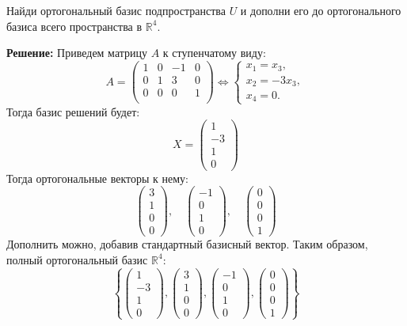 \documentclass[a4paper,12pt]{article}
\begin{document}
Найди ортогональный базис подпространства $U$ и дополни его до ортогонального базиса всего пространства в $\mathbb{R}^4$.

\textbf{Решение:}
Приведем матрицу $A$ к ступенчатому виду:
\[
A = \begin{pmatrix}
1 & 0 & -1 & 0 \\
0 & 1 & 3 & 0 \\
0 & 0 & 0 & 1 \\
\end{pmatrix} \Longleftrightarrow 
\begin{cases}
x_1 = x_3, \\
x_2 = -3x_3, \\
x_4 = 0.
\end{cases}
\]
Тогда базис решений будет:
\[
X = \begin{pmatrix}
1 \\ -3 \\ 1 \\ 0
\end{pmatrix}
\]
Тогда ортогональные векторы к нему:
\[
\begin{pmatrix}
3 \\ 1 \\ 0 \\ 0
\end{pmatrix}, \quad
\begin{pmatrix}
-1 \\ 0 \\ 1 \\ 0
\end{pmatrix}, \quad
\begin{pmatrix}
0 \\ 0 \\ 0 \\ 1
\end{pmatrix}
\]
Дополнить можно, добавив стандартный базисный вектор. Таким образом, полный ортогональный базис $\mathbb{R}^4$:
\[
\left\{
\begin{pmatrix} 1 \\ -3 \\ 1 \\ 0 \end{pmatrix},
\begin{pmatrix} 3 \\ 1 \\ 0 \\ 0 \end{pmatrix},
\begin{pmatrix} -1 \\ 0 \\ 1 \\ 0 \end{pmatrix},
\begin{pmatrix} 0 \\ 0 \\ 0 \\ 1 \end{pmatrix}
\right\}
\]
\end{document}
